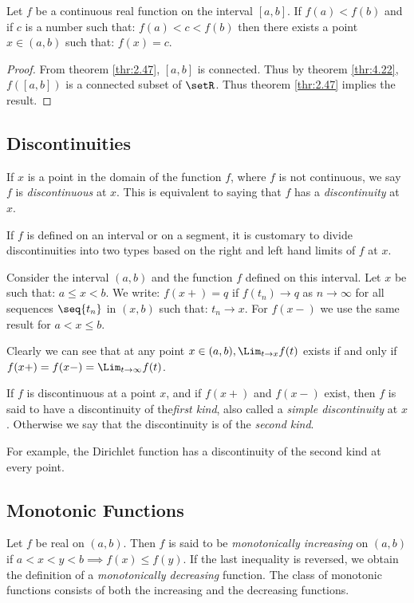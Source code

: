 \documentclass[12pt, letterpaper]{paper}
\begin{document}
\begin{theorem}
  \label{thr:4.23}
  Let $f$ be a continuous real function on the interval $[a,b]$. If
  $f(a) < f(b)$ and if $c$ is a number such that: $f(a) < c < f(b)$
  then there exists a point $x \in (a,b)$ such that: $f(x) = c$.

  \begin{proof}
    From theorem \ref{thr:2.47}, $[a,b]$ is connected. Thus by theorem
    \ref{thr:4.22}, $f([a,b])$ is a connected subset of $\setR$. Thus
    theorem \ref{thr:2.47} implies the result.
  \end{proof}
\end{theorem}

\subsection{Discontinuities}

If $x$ is a point in the domain of the function $f$, where $f$ is not
continuous, we say $f$ is \emph{discontinuous} at $x$. This is
equivalent to saying that $f$ has a \emph{discontinuity} at $x$.

If $f$ is defined on an interval or on a segment, it is customary to
divide discontinuities into two types based on the right and left hand
limits of $f$ at $x$.

Consider the interval $(a,b)$ and the function $f$ defined on this
interval. Let $x$ be such that: $a \leq x < b$. We write: $f(x+) = q$ if
$f(t_n) \to q$ as $n \to \infty$ for all sequences $\seq{t_n}$ in
$(x,b)$ such that: $t_n \to x$. For $f(x-)$ we use the same result for
$a<x\leq b$.

Clearly we can see that at any point $x \in (a,b), \Lim_{t\to x}f(t)$
exists if and only if $f(x+) = f(x-)=\Lim_{t \to \infty}f(t)$.

If $f$ is discontinuous at a point $x$, and if $f(x+)$ and $f(x-)$
exist, then $f$ is said to have a discontinuity of the\emph{first
  kind}, also called a \emph{simple discontinuity} at $x$. Otherwise
we say that the discontinuity is of the \emph{second kind}.

For example, the Dirichlet function has a discontinuity of the second
kind at every point.

\subsection{Monotonic Functions}
Let $f$ be real on $(a,b)$. Then $f$ is said to be \emph{monotonically
increasing} on $(a,b)$ if $a < x < y < b \implies f(x) \leq f(y)$. If the
last inequality is reversed, we obtain the definition of a
\emph{monotonically decreasing} function. The class of monotonic
functions consists of both the increasing and the decreasing
functions.
\end{document}
